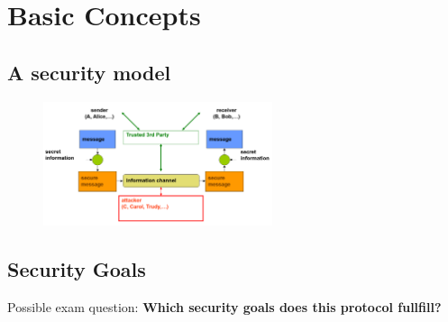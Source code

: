 \documentclass[11pt,british,faculty=ea,layout=titlefont,underline=false,titleUppercase=true,titleUnderline=true,hidelinks]{ugent2016-report}
\begin{document}
\chapter{Basic Concepts} \label{cha:basic-concepts}
	\section{A security model} \label{sec:a-security⁻model}
        \begin{figure}[h]
            \centering
			\includegraphics[width=0.6\textwidth]{images/network-security-model.png}    
		\end{figure}

    \section{Security Goals} \label{sec:security-goals}
        Possible exam question: \textbf{Which security goals does this protocol fullfill?}
\end{document}
